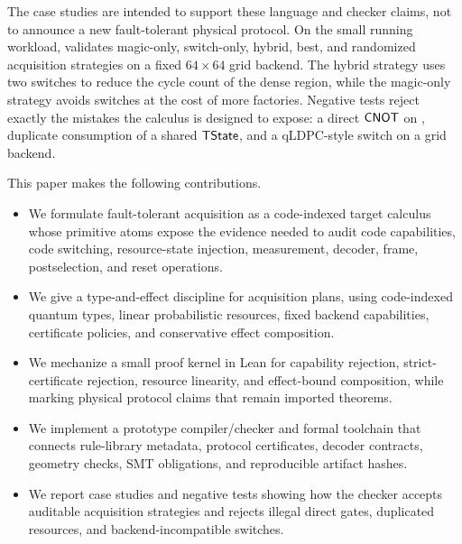 The case studies are intended to support these language and checker claims, not to announce a new fault-tolerant physical protocol.
On the small running workload, \system validates magic-only, switch-only, hybrid, best, and randomized acquisition strategies on a fixed $64\times64$ grid backend.
The hybrid strategy uses two switches to reduce the cycle count of the dense region, while the magic-only strategy avoids switches at the cost of more factories.
Negative tests reject exactly the mistakes the calculus is designed to expose: a direct $\mathsf{CNOT}$ on , duplicate consumption of a shared $\mathsf{TState}$, and a qLDPC-style switch on a grid backend.

This paper makes the following contributions.
\begin{itemize}[leftmargin=*]
  \item We formulate fault-tolerant acquisition as a code-indexed target calculus whose primitive atoms expose the evidence needed to audit code capabilities, code switching, resource-state injection, measurement, decoder, frame, postselection, and reset operations.
  \item We give a type-and-effect discipline for acquisition plans, using code-indexed quantum types, linear probabilistic resources, fixed backend capabilities, certificate policies, and conservative effect composition.
  \item We mechanize a small proof kernel in Lean for capability rejection, strict-certificate rejection, resource linearity, and effect-bound composition, while marking physical protocol claims that remain imported theorems.
  \item We implement a prototype compiler/checker and formal toolchain that connects rule-library metadata, protocol certificates, decoder contracts, geometry checks, SMT obligations, and reproducible artifact hashes.
  \item We report case studies and negative tests showing how the checker accepts auditable acquisition strategies and rejects illegal direct gates, duplicated resources, and backend-incompatible switches.
\end{itemize}
